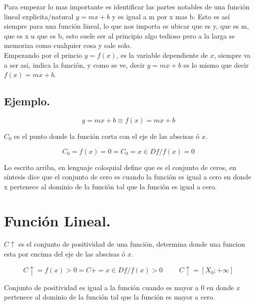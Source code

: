 \documentclass{article}
\begin{document}
	Para empezar lo mas importante es identificar las partes notables de una función lineal explicita/natural $y=mx+b$ y es igual a m por x mas b.
	Esto es así siempre para una función lineal, lo que nos importa es ubicar que es y, que es m, que es x u que es b, esto suele ser al principio algo tedioso pero a la larga se memoriza como cualquier cosa y sale solo. \\
	Empezando por el princio $y = f(x)$, es la variable dependiente de $x$, siempre va a ser asi, indica la función, y como se ve, decir $y = mx+b$ es lo mismo que decir $f(x) = mx+b$.
	\begin{center}
		\section*{Ejemplo.}
		\begin{equation*}
			y = mx+b \equiv f(x)=mx+b
		\end{equation*}
	\end{center}
	
	$C_0$ es el punto donde la función corta con el eje de las abscisas ó $x$.
	\begin{center}
		\begin{equation*}
			C_0 = f(x) = 0 = C_0 = {x\in Df / f(x) = 0}
		\end{equation*}
	\end{center} 
	Lo escrito arriba, en lenguaje coloquial define que es el conjunto de ceros, en síntesis dice que el conjunto de cero es cuando la función es igual a cero en donde x pertenece al dominio de la función tal que la función es igual a cero.
	\pagebreak
	\section{Función Lineal.}
	\vspace{5pt}
	$C\uparrow$ es el conjunto de positividad de una función, determina donde una funcion esta por encima del eje de las abscisas ó $x$.
	\begin{center}
		\begin{equation*}
			C\uparrow = f(x) > 0 = C+ = {x\in Df / f(x) > 0} \hspace{1cm} C\uparrow=[X_0;+\infty]
		\end{equation*}
	\end{center}
	Conjunto de positividad es igual a la función cuando es mayor a 0 en donde $x$ pertenece al dominio de la función tal que la función es mayor a cero. \\
	
\end{document}
